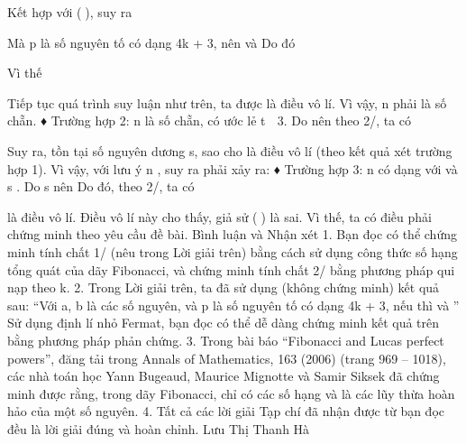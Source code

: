 \begin{multicols}{2}
	Kết hợp với (), suy ra
	
	Mà p là số nguyên tố có dạng 4k + 3, nên   và   Do đó
	
	Vì thế
	
	Tiếp tục quá trình suy luận như trên, ta được   là điều vô lí. Vì vậy, n phải là số chẵn.
	♦ Trường hợp 2: n là số chẵn, có ước lẻ t  3.
	Do   nên theo 2/, ta có
	
	Suy ra, tồn tại số nguyên dương s, sao cho   là điều vô lí (theo kết quả xét trường hợp 1). Vì vậy, với lưu ý n , suy ra phải xảy ra:
	♦ Trường hợp 3: n có dạng   với   và s .
	Do s  nên   Do đó, theo 2/, ta có
	
	là điều vô lí. Điều vô lí này cho thấy, giả sử () là sai. Vì thế, ta có điều phải chứng minh theo yêu cầu đề bài.
	Bình luận và Nhận xét
	1. Bạn đọc có thể chứng minh tính chất 1/ (nêu trong Lời giải trên) bằng cách sử dụng công thức số hạng tổng quát của dãy Fibonacci, và chứng minh tính chất 2/ bằng phương pháp qui nạp theo k.
	2. Trong Lời giải trên, ta đã sử dụng (không chứng minh) kết quả sau:
	“Với a, b là các số nguyên, và p là số nguyên tố có dạng 4k + 3, nếu   thì   và  ”
	Sử dụng định lí nhỏ Fermat, bạn đọc có thể dễ dàng chứng minh kết quả trên bằng phương pháp phản chứng.
	3. Trong bài báo “Fibonacci and Lucas perfect powers”, đăng tải trong Annals of Mathematics, 163 (2006) (trang 969 – 1018), các nhà toán học Yann Bugeaud, Maurice Mignotte và Samir Siksek đã chứng minh được rằng, trong dãy Fibonacci, chỉ có các số hạng   và   là các lũy thừa hoàn hảo của một số nguyên.
	4. Tất cả các lời giải Tạp chí đã nhận được từ bạn đọc đều là lời giải đúng và hoàn chỉnh.
	Lưu Thị Thanh Hà
\end{multicols}

